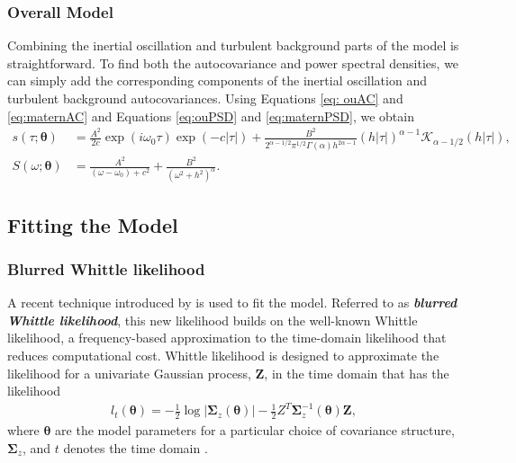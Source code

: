 \documentclass{stat572Style}
\begin{document}
\subsubsection{Overall Model}
Combining the inertial oscillation and turbulent background parts of the model is straightforward.
 To find both the autocovariance and power spectral densities, we can simply add the corresponding components of the inertial oscillation and turbulent background autocovariances. 
 Using Equations \eqref{eq: ouAC} and \eqref{eq:maternAC} and Equations \eqref{eq:ouPSD} and \eqref{eq:maternPSD}, we obtain
\begin{align}
\label{eq: fullSpec}
s(\tau ;\boldsymbol{\theta}) &= \frac{A^{2}}{2c} \exp(i \omega_{0}\tau) \exp(-c|\tau|) +  \frac{B^{2}}{2^{\alpha - 1/2}\pi^{1/2} \Gamma(\alpha) h^{2 \alpha - 1}}(h|\tau|)^{\alpha - 1}\mathcal{K}_{\alpha - 1/2}(h|\tau|)
,\\
S(\omega; \boldsymbol{\theta}) &= \frac{A^{2}}{(\omega - \omega_{0}) + c^{2}} + \frac{B^{2}}{(\omega^{2} + h^{2})^{\alpha}}.
\end{align}



\subsection{Fitting the Model}
\subsubsection{Blurred Whittle likelihood}
\par A recent technique introduced by \citet{Sykulski2013}  is used to fit the model.
 Referred to as \textbf{\it{blurred Whittle likelihood}}, this new likelihood builds on the well-known Whittle likelihood, a frequency-based approximation  to the time-domain likelihood that reduces computational cost. 
  Whittle likelihood is designed to approximate the likelihood for a univariate Gaussian process, $\boldsymbol{Z}$,  in the time domain that has the likelihood
\begin{align*}
l_{t}(\boldsymbol{\theta}) = - \frac{1}{2} \log \left|\boldsymbol{\Sigma}_{z}(\boldsymbol{\theta}) \right| - \frac{1}{2} Z^{T} \boldsymbol{\Sigma}_{z}^{-1}(\boldsymbol{\theta})\boldsymbol{Z},
\end{align*}
where $\boldsymbol{\theta}$ are the model parameters for a particular choice of covariance structure, $\boldsymbol{\Sigma}_{z}$,  and $t$ denotes the time domain  \citep{Sykulski2013}. 
\end{document}
